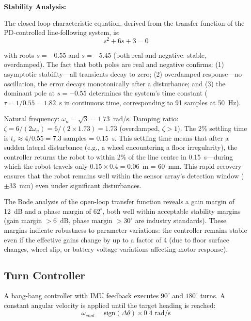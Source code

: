 \documentclass[12pt,a4paper,oneside]{report}
\begin{document}
\textbf{Stability Analysis:}

The closed-loop characteristic equation, derived from the transfer function of the PD-controlled line-following system, is:
\begin{equation}
s^2 + 6s + 3 = 0
\label{eq:char_eq}
\end{equation}

with roots $s = -0.55$ and $s = -5.45$ (both real and negative: stable, overdamped). The fact that both poles are real and negative confirms: (1) asymptotic stability---all transients decay to zero; (2) overdamped response---no oscillation, the error decays monotonically after a disturbance; and (3) the dominant pole at $s = -0.55$ determines the system's time constant ($\tau = 1/0.55 = 1.82$~s in continuous time, corresponding to 91 samples at 50~Hz).

Natural frequency: $\omega_n = \sqrt{3} = 1.73$~rad/s. Damping ratio: $\zeta = 6/(2\omega_n) = 6/(2 \times 1.73) = 1.73$ (overdamped, $\zeta > 1$). The 2\% settling time is $t_s \approx 4/0.55 = 7.3$ samples = 0.15~s. This settling time means that after a sudden lateral disturbance (e.g., a wheel encountering a floor irregularity), the controller returns the robot to within 2\% of the line centre in 0.15~s---during which the robot travels only $0.15 \times 0.4 = 0.06$~m = 60~mm. This rapid recovery ensures that the robot remains well within the sensor array's detection window ($\pm 33$~mm) even under significant disturbances.

The Bode analysis of the open-loop transfer function reveals a gain margin of 12~dB and a phase margin of $62^{\circ}$, both well within acceptable stability margins (gain margin $> 6$~dB, phase margin $> 30^{\circ}$ are industry standards). These margins indicate robustness to parameter variations: the controller remains stable even if the effective gains change by up to a factor of 4 (due to floor surface changes, wheel slip, or battery voltage variations affecting motor response).

\subsection{Turn Controller}

A bang-bang controller with IMU feedback executes $90^{\circ}$ and $180^{\circ}$ turns. A constant angular velocity is applied until the target heading is reached:
\begin{equation}
\omega_{cmd} = \text{sign}(\Delta\theta) \times 0.4 \text{~rad/s}
\label{eq:turn_cmd}
\end{equation}
\end{document}
